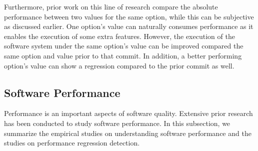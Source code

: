 Furthermore, prior work on this line of research compare the absolute performance between two values for the same option, while this can be subjective as discussed earlier. One option's value can naturally consumes performance as it enables the execution of some extra features. However, the execution of the software system under the same option's value can be improved compared the same option and value prior to that commit. In addition, a better performing option's value can show a regression compared to the prior commit as well. %

\subsection{Software Performance}

Performance is an important aspects of software quality. Extensive prior research has been conducted to study software performance. In this subsection, we summarize the empirical studies on  %
understanding software performance and the studies on %
performance regression detection.

